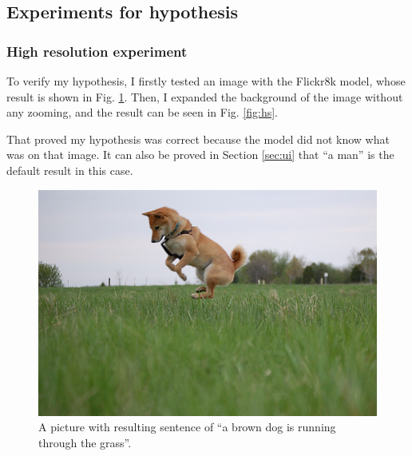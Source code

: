 \documentclass[10pt,twocolumn,letterpaper]{article}
\begin{document}
\subsection{Experiments for hypothesis}
\subsubsection{High resolution experiment} \label{sec:hs}
To verify my hypothesis, I firstly tested an image with the Flickr8k model, whose result is shown in Fig. \ref{fig:hsori}.
Then, I expanded the background of the image without any zooming, and the result can be seen in Fig. \ref{fig:hs}.

That proved my hypothesis was correct because the model did not know what was on that image.
It can also be proved in Section \ref{sec:ui} that ``a man'' is the default result in this case.

\begin{figure}[t]
    \begin{center}
        \includegraphics[width=0.9\linewidth]{2584487952_f70e5aa9bf_ori.jpg}
    \end{center}
    \caption{A picture with resulting sentence of ``a brown dog is running through the grass''.}
    \label{fig:hsori}
\end{figure}
\end{document}

